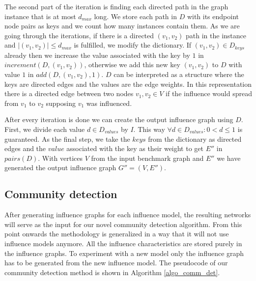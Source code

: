 \documentclass[pdflatex,sn-mathphys-num]{sn-jnl}
\begin{document}
The second part of the iteration is finding each directed path in the graph instance that is at most $d_{max}$ long. We store each path in $D$ with its endpoint node pairs as keys and we count how many instances contain them. As we are going through the iterations, if there is a directed $(v_1,v_2)$ path in the instance and $|(v_1,v_2)| \leq d_{max}$ is fulfilled, we modify the dictionary. If $(v_1,v_2) \in D_{keys}$ already then we increase the value associated with the key by $1$ in $increment(D,(v_1,v_2))$, otherwise we add this new key $(v_1,v_2)$ to $D$ with value $1$ in $add(D,(v_1,v_2),1)$. $D$ can be interpreted as a structure where the keys are directed edges and the values are the edge weights. In this representation there is a directed edge between two nodes $v_1,v_2 \in V$ if the influence would spread from $v_1$ to $v_2$ supposing $v_1$ was influenced.

After every iteration is done we can create the output influence graph using $D$. First, we divide each value $d \in D_{values}$ by $I$. This way $\forall d \in D_{values}: 0 < d \leq 1$ is guaranteed. As the final step, we take the $keys$ from the dictionary as directed edges and the $value$ associated with the key as their weight to get $E''$ in $pairs(D)$. With vertices $V$ from the input benchmark graph and $E''$ we have generated the output influence graph $G''=(V,E'')$.


\subsection{Community detection}\label{subsec_commdet}

After generating influence graphs for each influence model, the resulting networks will serve as the input for our novel community detection algorithm. From this point onwards the methodology is generalized in a way that it will not use influence models anymore. All the influence characteristics are stored purely in the influence graphs. To experiment with a new model only the influence graph has to be generated from the new influence model. The pseudocode of our community detection method is shown in Algorithm \ref{algo_comm_det}.
\end{document}
